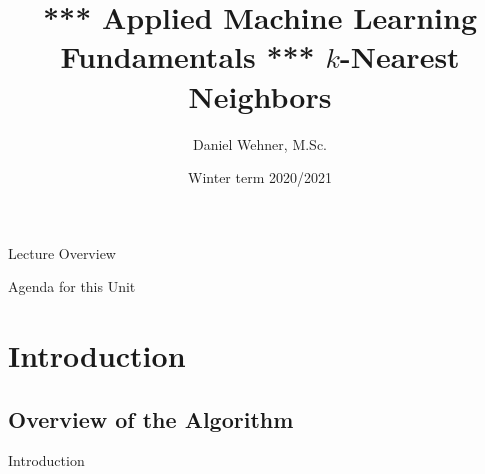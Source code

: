 


\title[$k$-Nearest Neighbors]{*** Applied Machine Learning Fundamentals *** $k$-Nearest Neighbors}
\author{Daniel Wehner, M.Sc.}
\date{Winter term 2020/2021}




\maketitlepage


\begin{frame}{Lecture Overview}{}
\end{frame}


\begin{frame}{Agenda for this Unit}
	\begin{multicols}{2}
		\tableofcontents
	\end{multicols}
\end{frame}


\section{Introduction}

\subsection{Overview of the Algorithm}

\begin{frame}{Introduction}{}
\end{frame}


